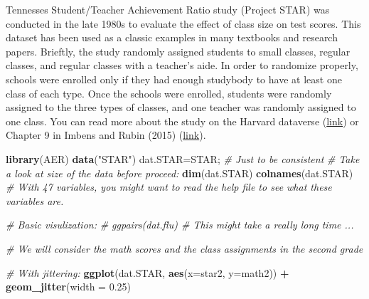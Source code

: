 \documentclass[12pt,]{book}
\newenvironment{Shaded}{\begin{snugshade}}{\end{snugshade}}
\newcommand{\KeywordTok}[1]{\textcolor[rgb]{0.13,0.29,0.53}{\textbf{#1}}}
\newcommand{\DataTypeTok}[1]{\textcolor[rgb]{0.13,0.29,0.53}{#1}}
\newcommand{\FloatTok}[1]{\textcolor[rgb]{0.00,0.00,0.81}{#1}}
\newcommand{\StringTok}[1]{\textcolor[rgb]{0.31,0.60,0.02}{#1}}
\newcommand{\CommentTok}[1]{\textcolor[rgb]{0.56,0.35,0.01}{\textit{#1}}}
\newcommand{\OperatorTok}[1]{\textcolor[rgb]{0.81,0.36,0.00}{\textbf{#1}}}
\newcommand{\NormalTok}[1]{#1}
\begin{document}
Tennesses Student/Teacher Achievement Ratio study (Project STAR) was
conducted in the late 1980s to evaluate the effect of class size on test
scores. This dataset has been used as a classic examples in many
textbooks and research papers. Brieftly, the study randomly assigned
students to small classes, regular classes, and regular classes with a
teacher's aide. In order to randomize properly, schools were enrolled
only if they had enough studybody to have at least one class of each
type. Once the schools were enrolled, students were randomly assigned to
the three types of classes, and one teacher was randomly assigned to one
class. You can read more about the study on the Harvard dataverse
(\href{https://dataverse.harvard.edu/dataverse/star}{link}) or Chapter 9
in Imbens and Rubin (2015)
(\href{https://www.cambridge.org/core/books/causal-inference-for-statistics-social-and-biomedical-sciences/71126BE90C58F1A431FE9B2DD07938AB}{link}).

\begin{Shaded}
\begin{Highlighting}[]
\KeywordTok{library}\NormalTok{(AER)}
\KeywordTok{data}\NormalTok{(}\StringTok{"STAR"}\NormalTok{)}
\NormalTok{dat.STAR=STAR; }\CommentTok{# Just to be consistent}
\CommentTok{# Take a look at size of the data before proceed:}
\KeywordTok{dim}\NormalTok{(dat.STAR)}
\KeywordTok{colnames}\NormalTok{(dat.STAR)}
\CommentTok{# With 47 variables, you might want to read the help file to see what these variables are.}


\CommentTok{# Basic visulization:}
\CommentTok{# ggpairs(dat.flu) # This might take a really long time ...}

\CommentTok{# We will consider the math scores and the class assignments in the second grade}

\CommentTok{# With jittering:}
\KeywordTok{ggplot}\NormalTok{(dat.STAR, }\KeywordTok{aes}\NormalTok{(}\DataTypeTok{x=}\NormalTok{star2, }\DataTypeTok{y=}\NormalTok{math2)) }\OperatorTok{+}\StringTok{ }
\StringTok{  }\KeywordTok{geom_jitter}\NormalTok{(}\DataTypeTok{width =} \FloatTok{0.25}\NormalTok{)}
\end{Highlighting}
\end{Shaded}
\end{document}
